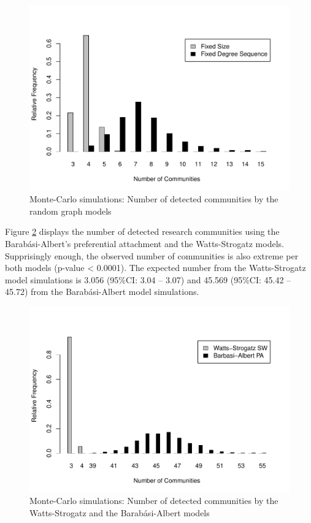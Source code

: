 \begin{figure}[!ht]
\centering
\includegraphics[scale=0.75]{Chapters/malaria/randomComm}
\caption{Monte-Carlo simulations: Number of detected communities by the random graph models}
\label{malaria_fig3}
\end{figure}

Figure \ref{malaria_fig4} displays the number of detected research communities using the Barab\'asi-Albert's preferential attachment and the Watts-Strogatz models. Supprisingly enough, the observed number of communities is also extreme per both models (p-value < 0.0001). The expected number from the Watts-Strogatz model simulations is 3.056 (95\%CI: 3.04 -- 3.07) and 45.569 (95\%CI: 45.42 -- 45.72) from the Barab\'asi-Albert model simulations.

\begin{figure}[!ht]
\centering
\includegraphics[scale=0.75]{Chapters/malaria/mechanisticComm}
\caption{Monte-Carlo simulations: Number of detected communities by the Watts-Strogatz and the Barab\'asi-Albert models}
\label{malaria_fig4}
\end{figure}

